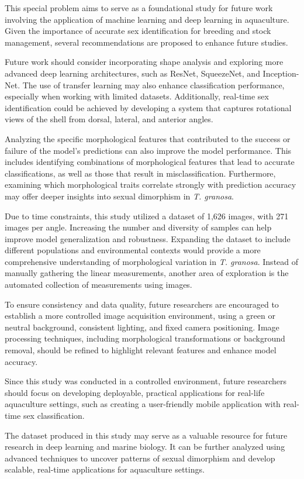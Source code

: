This special problem aims to serve as a foundational study for future work involving the application of machine learning and deep learning in aquaculture. Given the importance of accurate sex identification for breeding and stock management, several recommendations are proposed to enhance future studies. 

Future work should consider incorporating shape analysis and exploring more advanced deep learning architectures, such as ResNet, SqueezeNet, and Inception-Net. The use of transfer learning may also enhance classification performance, especially when working with limited datasets. Additionally, real-time sex identification could be achieved by developing a system that captures rotational views of the shell from dorsal, lateral, and anterior angles. 

Analyzing the specific morphological features that contributed to the success or failure of the model’s predictions can also improve the model performance. This includes identifying combinations of morphological features that lead to accurate classifications, as well as those that result in misclassification. Furthermore,  examining which morphological traits correlate strongly with prediction accuracy may offer deeper insights into sexual dimorphism in \textit{T. granosa}. 

Due to time constraints, this study utilized a dataset of 1,626 images, with 271 images per angle. Increasing the number and diversity of samples can help improve model generalization and robustness. Expanding the dataset to include different populations and environmental contexts would provide a more comprehensive understanding of morphological variation in \textit{T. granosa}. Instead of manually gathering the linear measurements, another area of exploration is the automated collection of measurements using images. 

To ensure consistency and data quality, future researchers are encouraged to establish a more controlled image acquisition environment, using a green or neutral background, consistent lighting, and fixed camera positioning. Image processing techniques, including morphological transformations or background removal, should be refined to highlight relevant features and enhance model accuracy. 

Since this study was conducted in a controlled environment, future researchers should focus on developing deployable, practical applications for real-life aquaculture settings, such as creating a user-friendly mobile application with real-time sex classification. 

The dataset produced in this study may serve as a valuable resource for future research in deep learning and marine biology. It can be further analyzed using advanced techniques to uncover patterns of sexual dimorphism and develop scalable, real-time applications for aquaculture settings.

